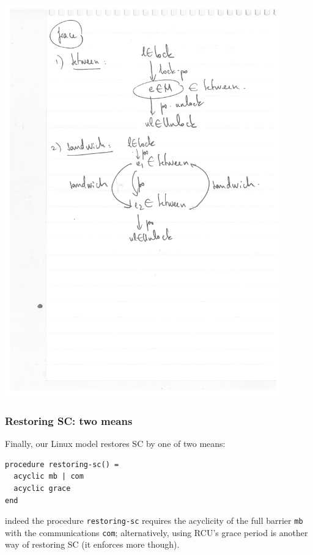 \documentclass[a4paper]{article}
\begin{document}
\includegraphics[width=12cm]{grace}

\pagebreak

\subsubsection{Restoring SC: two means}

Finally, our Linux model restores SC by one of two means:
\begin{verbatim}
procedure restoring-sc() =
  acyclic mb | com
  acyclic grace
end
\end{verbatim}
\noindent indeed the procedure {\tt restoring-sc} requires the acyclicity of
the full barrier {\tt mb} with the communications {\tt com}; alternatively,
using RCU's grace period is another way of restoring SC (it enforces more
though).
\end{document}
